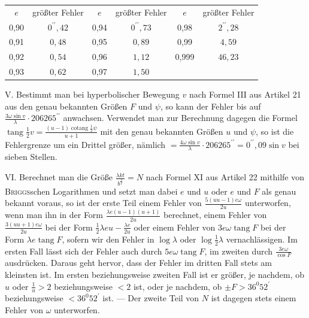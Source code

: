 \begin{center}
\begin{tabular}{c|c||c|c||c|c}
$e$ & größter Fehler & $e$ & größter Fehler & $e$ & größter Fehler \\
0,90 & $0^{\prime\prime}{,}42$ & 0,94 & $0^{\prime\prime}{,}73$ & 0,98 & $2^{\prime\prime}{,}28$ \\
0,91 & $0{,}48$ & 0,95 & $0{,}89$ & 0,99 & $4{,}59$ \\
0,92 & $0{,}54$ & 0,96 & $1{,}12$ & 0,999 & $46{,}23$ \\
0,93 & $0{,}62$ & 0,97 & $1{,}50$ & & \\
\end{tabular}
\end{center}

V. Bestimmt man bei hyperbolischer Bewegung $v$ nach Formel III aus Artikel 21 aus den genau bekannten Größen $F$ und $\psi$, so kann der Fehler bis auf $\frac{3\omega\sin v}{\lambda}\cdot206265^{\prime\prime}$ anwachsen. Verwendet man zur Berechnung dagegen die Formel $\operatorname{tang}\frac{1}{2}v=\frac{(u-1)\operatorname{cotang}\frac{1}{2}\psi}{u+1}$ mit den genau bekannten Größen $u$ und $\psi$, so ist die Fehlergrenze um ein Drittel größer, nämlich $=\frac{4\omega\sin v}{\lambda}\cdot206265^{\prime\prime}=0^{\prime\prime}{,}09\sin v$ bei sieben Stellen.

VI. Berechnet man die Größe $\frac{\lambda kt}{b^{\frac{3}{2}}}=N$ nach Formel XI aus Artikel 22 mithilfe von \textsc{Briggs}schen Logarithmen und setzt man dabei $e$ und $u$ oder $e$ und $F$ als genau bekannt voraus, so ist der erste Teil einem Fehler von $\frac{5(uu-1)e\omega}{2u}$ unterworfen, wenn man ihn in der Form $\frac{\lambda e(u-1)(u+1)}{2u}$ berechnet, einem Fehler von $\frac{3(uu+1)e\omega}{2u}$ bei der Form $\frac{1}{2}\lambda eu-\frac{\lambda e}{2u}$ oder einem Fehler von $3e\omega\operatorname{tang}F$ bei der Form $\lambda e\operatorname{tang}F$, sofern wir den Fehler in $\log\lambda$ oder $\log\frac{1}{2}\lambda$ vernachlässigen. Im ersten Fall lässt sich der Fehler auch durch
$5e\omega\operatorname{tang}F$, im zweiten durch $\frac{3e\omega}{\cos F}$ ausdrücken. Daraus geht hervor, dass der Fehler im dritten Fall stets am kleinsten ist. Im ersten beziehungsweise zweiten Fall ist er größer, je nachdem, ob $u$ oder $\frac{1}{u}>2$ beziehungsweise $<2$ ist, oder je nachdem, ob $\pm F>36^0 52^{\prime}$ beziehungsweise $<36^0 52^{\prime}$ ist. — Der zweite Teil von $N$ ist dagegen stets einem Fehler von $\omega$ unterworfen.

